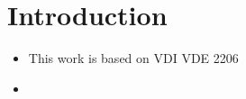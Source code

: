\chapter{Introduction}

\begin{itemize}
    \item This work is based on VDI VDE 2206
    \item 
\end{itemize}